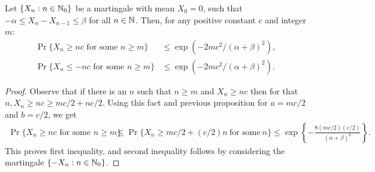 \documentclass[a4paper,10pt,english]{article}
\begin{document}
\begin{thm} Let $\{X_n : n \in \mathbb{N}_0\}$ be a martingale with mean $X_0=0$, such that $-\alpha \leq X_n-X_{n-1} \leq \beta $ for all $n \in \mathbb{N}$. 
Then, for any positive constant $c$ and integer $m$:
\begin{align*}
\Pr\{X_n \geq nc\text{ for some }n \geq m\} &\leq \exp\left(-2mc^2/{(\alpha+\beta)}^2\right),\\
\Pr\{X_n \leq -nc\text{ for some }n \geq m\} &\leq \exp\left(-2mc^2/{(\alpha+\beta)}^2\right).
\end{align*}
\end{thm}
\begin{proof}
Observe that if there is an $n$ such that $n \geq m$ and $X_n \geq nc$ then for that $n, X_n \geq nc \geq mc/2+nc/2$. 
Using this fact and previous proposition for $a = mc/2$ and $b = c/2$, we get
\begin{align*}
\Pr\{X_n \geq nc\text{ for some }n \geq m\} &\leq \Pr\{X_n \geq mc/2+(c/2)n~ \text{for some} ~ n\}\leq \exp\left\{-\frac{8(mc/2)(c/2)}{(\alpha+\beta)^2}\right\}.
\end{align*}
This proves first inequality, and second inequality follows by considering the martingale $\{-X_n: n \in \mathbb{N}_0\}$.
\end{proof}
\end{document}
